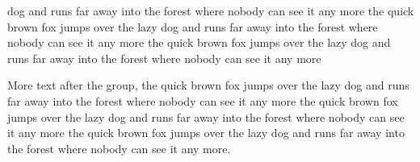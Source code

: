 \documentclass{article}
\begin{document}
{dog and runs far away into the forest where nobody can see it any more the quick brown fox jumps over the lazy dog and runs far away into the forest where nobody can see it any more the quick brown fox jumps over the lazy dog and runs far away into the forest where nobody can see it any more\par}
More text after the group, the quick brown fox jumps over the lazy dog and runs far away into the forest where nobody can see it any more the quick brown fox jumps over the lazy dog and runs far away into the forest where nobody can see it any more the quick brown fox jumps over the lazy dog and runs far away into the forest where nobody can see it any more.
\end{document}
